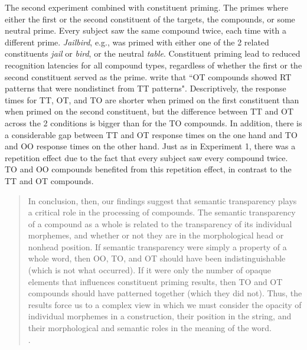 The second experiment combined  with constituent
priming.
The primes where either the first or the second constituent
of the targets, the compounds, or some neutral prime. Every subject saw the same compound twice, each time
with a different prime. \emph{Jailbird},
e.g., was primed with either one of the 2 related constituents
\emph{jail} or \emph{bird}, or the neutral
\emph{table}. Constituent priming lead to reduced recognition
latencies for all compound types, regardless of whether the first or
the second constituent served as the
prime. \citet[60]{Libbenetal:2003} write that ``OT compounds showed RT
patterns that were nondistinct from TT patterns". 
Descriptively, the response times for TT, OT, and TO are shorter
when primed on the first constituent than when primed on the second
constituent, but the difference between TT and OT across the 2
conditions is bigger than for the TO compounds. In addition, there is
a considerable gap between TT and OT response times on the one hand
and TO and OO response times on the other hand. Just as in Experiment 1, there was a
repetition effect due to the fact that every subject saw every
compound twice. TO and OO compounds benefited from this repetition
effect, in contrast to the TT and OT compounds.
\begin{quotation}
In conclusion,
then, our findings suggest that semantic transparency plays a critical
role in the processing of compounds. The semantic transparency of a
compound as a whole is related to the transparency of its individual
morphemes, and whether or not they are in the morphological head or
nonhead position. If semantic transparency were simply a property of a
whole word, then OO, TO, and OT should have been indistinguishable
(which is not what occurred). If it were only the number of opaque
elements that influences constituent priming results, then TO and OT
compounds should have patterned together (which they did not). Thus,
the results force us to a complex view in which we must consider the
opacity of individual morphemes in a construction, their position in
the string, and their morphological and semantic roles in the meaning
of the word.\\ \citep[63]{Libbenetal:2003}.
\end{quotation}

